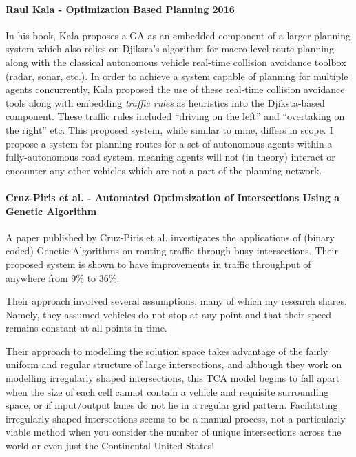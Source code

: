 \paragraph{Raul Kala - Optimization Based Planning 2016\cite{kalaOptimizationBasedPlanning2016}}
In his book, Kala proposes a GA as an embedded component of a larger planning system which also relies on Djiksra's algorithm for macro-level route planning along with the classical autonomous vehicle real-time collision avoidance toolbox (radar, sonar, etc.). In order to achieve a system capable of planning for multiple agents concurrently, Kala proposed the use of these real-time collision avoidance tools along with embedding \textit{traffic rules} as heuristics into the Djiksta-based component. These traffic rules included ``driving on the left'' and ``overtaking on the right'' etc. This proposed system, while similar to mine, differs in scope. I propose a system for planning routes for a set of autonomous agents within a fully-autonomous road system, meaning agents will not (in theory) interact or encounter any other vehicles which are not a part of the planning network.

\paragraph{Cruz-Piris et al. - Automated Optimsization of Intersections Using a Genetic Algorithm\cite{cruz-pirisAutomatedOptimizationIntersections2019}}
A paper published by Cruz-Piris et al. investigates the applications of (binary coded) Genetic Algorithms on routing traffic through busy intersections. Their proposed system is shown to have improvements in traffic throughput of anywhere from 9\% to 36\%.

Their approach involved several assumptions, many of which my research shares. Namely, they assumed vehicles do not stop at any point and that their speed remains constant at all points in time.

Their approach to modelling the solution space takes advantage of the fairly uniform and regular structure of large intersections, and although they work on modelling irregularly shaped intersections, this TCA model begins to fall apart when the size of each cell cannot contain a vehicle and requisite surrounding space, or if input/output lanes do not lie in a regular grid pattern. Facilitating irregularly shaped intersections seems to be a manual process, not a particularly viable method when you consider the number of unique intersections across the world or even just the Continental United States!

